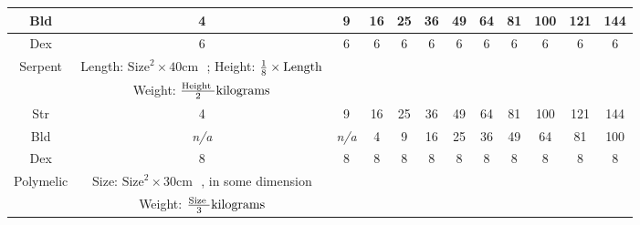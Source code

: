 \documentclass[twoside]{book}
\begin{document}
\begin{table}[htb]
\begin{center}
\begin{tabular}{|c|c|c|c|c|c|c|c|c|c|c|c|}
 Bld & 4 & 9 & 16 & 25 & 36 & 49 & 64 & 81 & 100 & 121 & 144 \\

\hline

 Dex & 6 & 6 & 6 & 6 & 6 & 6 & 6 & 6 & 6 & 6 & 6 \\

\hline

 Serpent &  Length: \begin{math}  
                        {\textrm{Size}}^{ 2 }   \times   40 \textrm{cm
                          }  \end{math} ; Height: \begin{math} 
                           {{ 1 }\over{ 8 }}  
                           \times  \textrm{Length}  \end{math}
                  \\

\hline

& Weight: \begin{math}  {{\textrm{Height
                    }}\over{ 2 }}  \textrm{kilograms} 
                     \end{math}
                  \\

\hline

 Str & 4 & 9 & 16 & 25 & 36 & 49 & 64 & 81 & 100 & 121 & 144 \\

\hline

 Bld &
                    \textit{n/a}
                  &
                    \textit{n/a}
                  & 4 & 9 & 16 & 25 & 36 & 49 & 64 & 81 & 100 \\

\hline

 Dex & 8 & 8 & 8 & 8 & 8 & 8 & 8 & 8 & 8 & 8 & 8 \\

\hline

 Polymelic &  Size: \begin{math}  
                        {\textrm{Size}}^{ 2 }   \times   30 \textrm{cm
                         }  \end{math} , in some dimension
                  \\

\hline

& Weight: \begin{math}  {{\textrm{Size
                    }}\over{ 3 }}  \textrm{kilograms} 
                     \end{math}
                  \\


\end{tabular}
\end{center}
\end{table}
\end{document}
